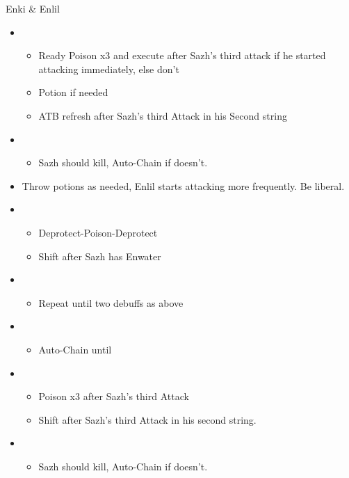 \begin{battle}[1:41]{Enki \& Enlil}
\begin{itemize}
\begin{itemize}
			      \end{itemize}
			\item \sixth
			      \begin{itemize}
				      \item Ready Poison x3 and execute after Sazh's third attack if he started attacking immediately, else don't
				      \item Potion if needed
				      \item ATB refresh after Sazh's third Attack in his Second string
			      \end{itemize}
			\item \first
			      \begin{itemize}
				      \item Sazh should kill, Auto-Chain if doesn't.
			      \end{itemize}
			\item Throw potions as needed, Enlil starts attacking more frequently. Be liberal.
			\item \third
			      \begin{itemize}
				      \item Deprotect-Poison-Deprotect
				      \item Shift after Sazh has Enwater
			      \end{itemize}
			\item \fifth
			      \begin{itemize}
				      \item Repeat until two debuffs as above
			      \end{itemize}
			\item \fourth
			      \begin{itemize}
				      \item Auto-Chain until \stagger
			      \end{itemize}
			\item \sixth
			      \begin{itemize}
				      \item Poison x3 after Sazh's third Attack
				      \item Shift after Sazh's third Attack in his second string.
			      \end{itemize}
			\item \first
			      \begin{itemize}
				      \item Sazh should kill, Auto-Chain if doesn't.
			      \end{itemize}
		\end{itemize}
\end{battle}
